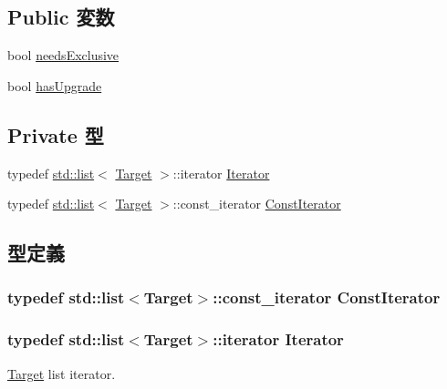 \subsection*{Public 変数}
\begin{DoxyCompactItemize}
\item 
bool \hyperlink{classMSHR_1_1TargetList_a546082d646a7cf9bda71269184b937b9}{needsExclusive}
\item 
bool \hyperlink{classMSHR_1_1TargetList_afd770d45ac12adb106ed9873fd3b1509}{hasUpgrade}
\end{DoxyCompactItemize}
\subsection*{Private 型}
\begin{DoxyCompactItemize}
\item 
typedef \hyperlink{classstd_1_1list}{std::list}$<$ \hyperlink{classMSHR_1_1Target}{Target} $>$::iterator \hyperlink{classMSHR_1_1TargetList_a8e2583d27fed2a1a2c4bc45749e09cf1}{Iterator}
\item 
typedef \hyperlink{classstd_1_1list}{std::list}$<$ \hyperlink{classMSHR_1_1Target}{Target} $>$::const\_\-iterator \hyperlink{classMSHR_1_1TargetList_a13152b569944932d23706d9729a96267}{ConstIterator}
\end{DoxyCompactItemize}


\subsection{型定義}
\hypertarget{classMSHR_1_1TargetList_a13152b569944932d23706d9729a96267}{
\subsubsection[{ConstIterator}]{\setlength{\rightskip}{0pt plus 5cm}typedef {\bf std::list}$<${\bf Target}$>$::const\_\-iterator {\bf ConstIterator}}}
\label{classMSHR_1_1TargetList_a13152b569944932d23706d9729a96267}
\hypertarget{classMSHR_1_1TargetList_a8e2583d27fed2a1a2c4bc45749e09cf1}{
\subsubsection[{Iterator}]{\setlength{\rightskip}{0pt plus 5cm}typedef {\bf std::list}$<${\bf Target}$>$::iterator {\bf Iterator}}}
\label{classMSHR_1_1TargetList_a8e2583d27fed2a1a2c4bc45749e09cf1}
\hyperlink{classMSHR_1_1Target}{Target} list iterator. 

